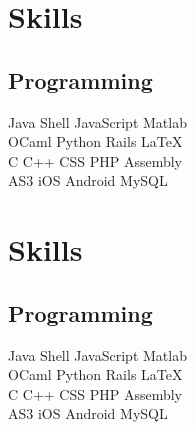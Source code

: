 \documentclass[]{deedy-resume-openfont}
\begin{document}
\begin{minipage}[t]{0.33\textwidth}
    \section{Skills}
        \subsection{Programming}
        Java \textbullet{}   Shell \textbullet{} JavaScript \textbullet{} Matlab \\
        OCaml \textbullet{} Python \textbullet{} Rails \textbullet{} \LaTeX\ \\ 
        C \textbullet{} C++ \textbullet{} CSS \textbullet{} PHP \textbullet{} Assembly \\
        AS3 \textbullet{} iOS \textbullet{} Android \textbullet{} MySQL
        \sectionsep

    \section{Skills}
        \subsection{Programming}
        Java \textbullet{}   Shell \textbullet{} JavaScript \textbullet{} Matlab \\
        OCaml \textbullet{} Python \textbullet{} Rails \textbullet{} \LaTeX\ \\ 
        C \textbullet{} C++ \textbullet{} CSS \textbullet{} PHP \textbullet{} Assembly \\
        AS3 \textbullet{} iOS \textbullet{} Android \textbullet{} MySQL
        \sectionsep

\end{minipage}
\hfill
\end{document}
